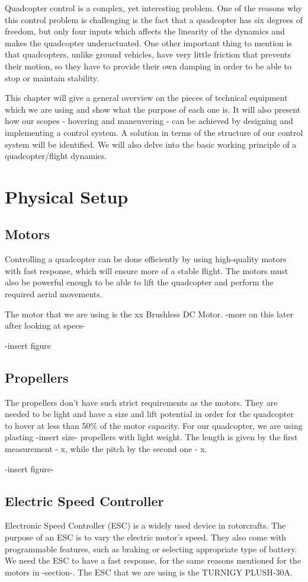 Quadcopter control is a complex, yet interesting problem. One of the reasons why this control problem is challenging is the fact that a quadcopter has six degrees of freedom, but only four inputs which affects the linearity of the dynamics and makes the quadcopter underactuated. One other important thing to mention is that quadcopters, unlike ground vehicles, have very little friction that prevents their motion, so they have to provide their own damping in order to be able to stop or maintain stability.

This chapter will give a general overview on the pieces of technical equipment which we are using and show what the purpose of each one is. It will also present how our scopes - hovering and maneuvering - can be achieved by designing and implementing a control system. A solution in terms of the structure of our control system will be identified. We will also delve into the basic working principle of a quadcopter/flight dynamics.

\section{Physical Setup}
\subsection{Motors}
Controlling a quadcopter can be done efficiently by using high-quality motors with fast response, which will ensure more of a stable flight. The motors must also be powerful enough to be able to lift the quadcopter and perform the required aerial movements. 

The motor that we are using is the xx Brushless DC Motor. -more on this later after looking at specs-

-insert figure

\subsection{Propellers}
The propellers don't have such strict requirements as the motors. They are needed to be light and have a size and lift potential in order for the quadcopter to hover at less than 50\% of the motor capacity. For our quadcopter, we are using plasting -insert size- propellers with light weight. The length is given by the first measurement - x, while the pitch by the second one - x.

-insert figure-

\subsection{Electric Speed Controller}
Electronic Speed Controller (ESC) is a widely used device in rotorcrafts. The purpose of an ESC is to vary the electric motor's speed. They also come with programmable features, such as braking or selecting appropriate type of battery. We need the ESC to have a fast response, for the same reasons mentioned for the motors in -section-. The ESC that we are using is the TURNIGY PLUSH-30A.

